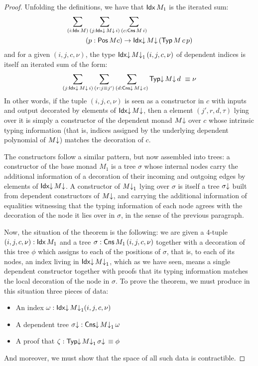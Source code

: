 \begin{proof}
  Unfolding the definitions, we have that $\mathsf{Idx}\, M_1$ is the
  iterated sum:
  \begin{equation}
    \label{eq:slc-idx}
    \begin{aligned}
      &\sum_{(i : \mathsf{Idx}\, M)} \sum_{(j : \mathsf{Idx}{\downarrow}\, M{\downarrow}\, i)} 
      \sum_{(c : \mathsf{Cns}\, M\, i)} \\
      &\hspace{1cm} (p : \mathsf{Pos}\, M c) \to \mathsf{Idx}{\downarrow}\, M{\downarrow}\, (\mathsf{Typ}\, M\, c\, p)
    \end{aligned}
  \end{equation}
  and for a given $(i,j,c,\nu)$, the type
  $\mathsf{Idx}{\downarrow}\, M{\downarrow}_1\, (i,j,c,\nu)$ of dependent indices is itself an
  iterated sum of the form:
  \begin{align*}
    \sum_{(j : \mathsf{Idx}{\downarrow}\, M{\downarrow}\, i)} \sum_{(r : j \equiv j')} 
    \sum_{(d : \mathsf{Cns}{\downarrow}\, M{\downarrow}\, c)} \mathsf{Typ}{\downarrow}\, M{\downarrow}\, d\ \equiv \nu
  \end{align*}
  In other words, if the tuple $(i,j,c,\nu)$ is seen as a constructor
  in $c$ with inputs and output decorated by elements of $\mathsf{Idx}{\downarrow}\, M{\downarrow}$,
  then a element $(j',r,d,\tau)$ lying over it is simply a constructor
  of the dependent monad $M{\downarrow}$ over $c$ whose intrinsic typing
  information (that is, indices assigned by the underlying dependent
  polynomial of $M{\downarrow}$) matches the decoration of $c$.

  The constructors follow a similar pattern, but now assembled into
  trees: a constructor of the base monad $M_1$ is a tree $\sigma$
  whose internal nodes carry the additional information of a
  decoration of their incoming and outgoing edges  by
  elements of $\mathsf{Idx}{\downarrow}\, M{\downarrow}$.  A constructor of $M{\downarrow}_1$ lying over
  $\sigma$ is itself a tree $\sigma{\downarrow}$ built from dependent
  constructors of $M{\downarrow}$, and carrying the additional information of
  equalities witnessing that the typing information of each node
  agrees with the decoration of the node it lies over in $\sigma$, in
  the sense of the previous paragraph. 

  Now, the situation of the theorem is the following: we are given a
  4-tuple $(i,j,c,\nu) : \mathsf{Idx}\, M_1$ and a tree
  $\sigma : \mathsf{Cns}\, M_1\, (i,j,c,\nu)$ together with a decoration of this
  tree $\phi$ which assigns to each of the positions of $\sigma$, that
  is, to each of its nodes, an index living in $\mathsf{Idx}{\downarrow}\, M{\downarrow}_1$, which
  as we have seen, means a single dependent constructor together with
  proofs that its typing information matches the local decoration of
  the node in $\sigma$. To prove the theorem, we must produce in this
  situation three pieces of data:
  \begin{itemize}
  \item An index $\omega : \mathsf{Idx}{\downarrow}\, M{\downarrow}_1 (i,j,c,\nu)$
  \item A dependent tree $\sigma{\downarrow} : \mathsf{Cns}{\downarrow}\, M{\downarrow}_1\, \omega$
  \item A proof that $\zeta : \mathsf{Typ}{\downarrow}\, M{\downarrow}_1\, \sigma{\downarrow}\, \equiv \phi$
  \end{itemize}
  And moreover, we must show that the space of all such data is
  contractible.


\end{proof}
